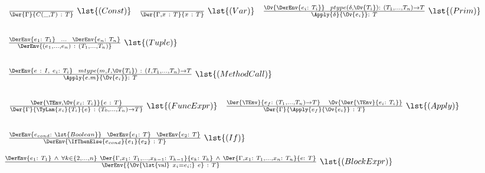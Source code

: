 \(\begin{array}{c c c}
	\frac{}{\Der{\Gamma}{C(\_, T)~:~T}}~\lst{(Const)}
	& 
	\frac{}{\Der{\Gamma,x~:~T}{x~:~T}}~\lst{(Var)}
	&
	\frac{
		\Ov{\DerEnv{e_i:~T_i}}~~
		ptype(\delta, \Ov{T_i}) :~(T_1,\dots,T_n) \to T
	}{
		\Apply{\delta}{\Ov{e_i}}:~T
	}~\lst{(Prim)} \\
	& & \\ 
\end{array}\) 



\(\begin{array}{c}
\frac{\DerEnv{e_1 :~T_1}~~\dots~~\DerEnv{e_n :~T_n}}
     {\DerEnv{(e_1,\dots,e_n)~:~(T_1,\dots,T_n)}}~\lst{(Tuple)} \\
\\ 
\end{array}\) 


\(\begin{array}{c}
\frac{
		\DerEnv{e~:~I,~e_i:~T_i}~~
		mtype(m, I, \Ov{T_i})~:~(I, T_1,\dots,T_n) \to T
	}
	{ \Apply{e.m}{\Ov{e_i}}:~T }~\lst{(MethodCall)} \\
\\ 
\end{array}\) 


\(\begin{array}{c c}
	\frac{\Der{\TEnv,\Ov{x_i:~T_i}}{e~:~T}}
	     {\Der{\Gamma}{\TyLam{x_i}{T_i}{e}~:~(T_0,\dots,T_n) \to T}}~\lst{(FuncExpr)}
		  & 
	\frac{ \Der{\TEnv}{e_f:~(T_1,\dots,T_n) \to T}~~~\Ov{\Der{\TEnv}{e_i:~T_i}} }
		 { \Der{\Gamma}{\Apply{e_f}{\Ov{e_i}}~:~T} }~\lst{(Apply)} \\
& \\ 
\end{array}\) 


\(\begin{array}{c c}
	\frac{ \DerEnv{e_{cond} :~\lst{Boolean}}~~\DerEnv{e_1 :~T}~~\DerEnv{e_2 :~T} }
		{ \DerEnv{\IfThenElse{e_{cond}}{e_1}{e_2}~:~T} }~\lst{(If)}
		 & 
		 \\
		 & \\ 
\end{array}\) 
\(
	\frac{ 
		\DerEnv{e_1 :~T_1}~\wedge~
		\forall k\in\{2,\dots,n\}~\Der{\Gamma,x_1:~T_1,\dots,x_{k-1}:~T_{k-1}}{e_k:~T_k}~\wedge~
        \Der{\Gamma,x_1:~T_1,\dots,x_n:~T_n}{e:~T}
		}
		{ \DerEnv{\{ \Ov{\text{\lst{val}}~x_i = e_i;}~e\}~:~T} }~\lst{(BlockExpr)}
\)